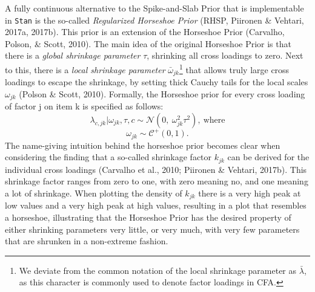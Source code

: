\documentclass[
  man, donotrepeattitle,floatsintext]{apa6}
\begin{document}
A fully continuous alternative to the Spike-and-Slab Prior that is
implementable in \texttt{Stan} is the so-called \emph{Regularized Horseshoe Prior}
(RHSP, Piironen \& Vehtari, 2017a, 2017b). This prior
is an extension of the Horseshoe Prior (Carvalho, Polson, \& Scott, 2010). The
main idea of the original Horseshoe Prior is that there is a \emph{global
shrinkage parameter} \(\tau\), shrinking all cross loadings to zero. Next
to this, there is a \emph{local shrinkage parameter} \(\bar{\omega}_{jk}\)\footnote{We deviate from the common notation of the local shrinkage
  parameter as \(\bar{\lambda}\), as this character is commonly used to
  denote factor loadings in CFA.}
that allows truly large cross loadings to escape the shrinkage, by
setting thick Cauchy tails for the local scales \(\omega_{jk}\)
(Polson \& Scott, 2010). Formally, the Horseshoe prior for every cross
loading of factor j on item k is specified as follows:
\[\lambda_{c,jk} | \omega_{jk}, \tau, c\sim \mathcal{N}(0, \ \omega^2_{jk} \tau^2), \ \text{where}\]
\[\omega_{jk} \sim \mathcal{C^+}(0, 1).\] The name-giving intuition
behind the horseshoe prior becomes clear when considering the finding
that a so-called shrinkage factor \(k_{jk}\) can be derived for the
individual cross loadings (Carvalho et al., 2010; Piironen \& Vehtari, 2017b). This shrinkage factor ranges from zero to one,
with zero meaning no, and one meaning a lot of shrinkage. When plotting
the density of \(k_{jk}\) there is a very high peak at low values and a
very high peak at high values, resulting in a plot that resembles a
horseshoe, illustrating that the Horseshoe Prior has the desired
property of either shrinking parameters very little, or very much, with
very few parameters that are shrunken in a non-extreme fashion.
\end{document}
